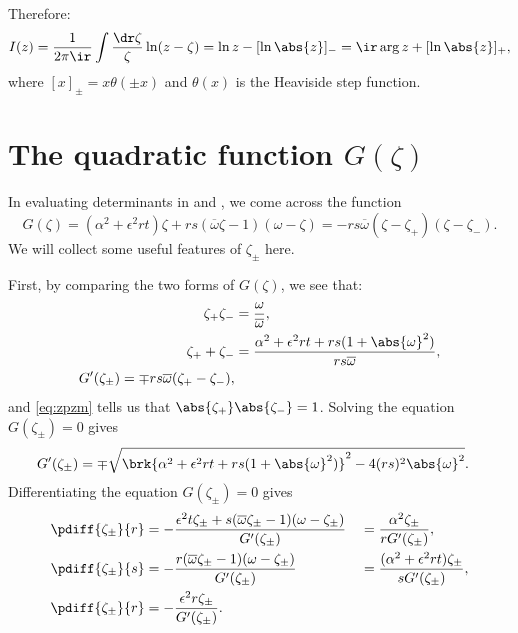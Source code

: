 \documentclass[12pt]{article}
\newcommand{\omb}{\overline{\omega}}
\begin{document}
Therefore:
%
\begin{equation}\label{eq:countourintresult}
  I(z) = \frac{1}{2\pi\ir}\int \frac{\dr\zeta}{\zeta} \ln(z-\zeta)
   = \ln z - [\ln\abs{z}]_-
   = \ir \arg z + [\ln\abs{z}]_+,
\end{equation}
%
where $[x]_\pm = x \theta(\pm x)$ and $\theta(x)$ is the Heaviside step function.


\section{The quadratic function \texorpdfstring{$G(\zeta)$}{G(zeta)}}\label{sec:Gamma}

In evaluating determinants in  and , we come across the function
%
\begin{equation}\label{eq:Gammadef}
  G(\zeta) = (\alpha^2+\epsilon^2rt)\zeta + rs(\omb\zeta-1)(\omega-\zeta) = - rs\omb (\zeta-\zeta_+) (\zeta-\zeta_-).
\end{equation}
%
We will collect some useful features of $\zeta_\pm$ here.

First, by comparing the two forms of $G(\zeta)$, we see that:
%
\begin{align}
\label{eq:zpzm}
  \zeta_+ \zeta_- &= \frac{\omega}{\omb},\\
  \label{eq:zppzm}
  \zeta_+ + \zeta_- &= \frac{\alpha^2+\epsilon^2rt + rs(1+\abs{\omega}^2)}{rs\omb},\\
  \label{eq:Gprime}
  G'(\zeta_\pm) = \mp rs\omb(\zeta_+ - \zeta_-),
\end{align}
%
and \eqref{eq:zpzm} tells us that $\abs{\zeta_+} \abs{\zeta_-}=1$.
Solving the equation $G(\zeta_\pm)=0$ gives
%
\begin{align}
\label{eq:Gprimesol}
  G'(\zeta_\pm) &= \mp\sqrt{\brk{\alpha^2+\epsilon^2rt + rs(1+\abs{\omega}^2)}^2
       - 4(rs)^2\abs{\omega}^2}.
\end{align}
%
Differentiating the equation $G(\zeta_\pm)=0$ gives
%
\begin{align}
\label{eq:dzpmdr}
  \pdiff{\zeta_\pm}{r} &=
    -\frac{\epsilon^2t\zeta_\pm + s(\omb\zeta_\pm-1)(\omega-\zeta_\pm)}{G'(\zeta_\pm)}
    &&= \frac{\alpha^2\zeta_\pm}{rG'(\zeta_\pm)},\\
\label{eq:dzpmds}
  \pdiff{\zeta_\pm}{s} &=
    -\frac{r(\omb\zeta_\pm-1)(\omega-\zeta_\pm)}{G'(\zeta_\pm)}
    &&= \frac{(\alpha^2+\epsilon^2rt)\zeta_\pm}{sG'(\zeta_\pm)},\\
\label{eq:dzpmdt}
  \pdiff{\zeta_\pm}{r} &=
    -\frac{\epsilon^2r\zeta_\pm}{G'(\zeta_\pm)}.
\end{align}
%
\end{document}
